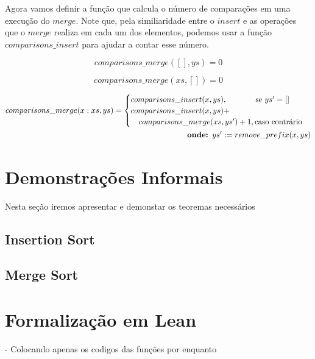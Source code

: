 \documentclass[12pt, oneside, a4paper,english,brazil]{abntex2}
\begin{document}
\qquad Agora vamos definir a fun\c{c}\~ao que calcula o n\'umero de compara\c{c}\~oes em uma execu\c{c}\~ao
do $merge$. Note que, pela similiaridade entre
o $insert$ e as opera\c{c}\~oes que o $merge$ realiza em cada um dos elementos,
podemos usar a fun\c{c}\~ao $comparisons\_insert$ para ajudar a contar esse n\'umero.

\begin{equation}
  comparisons\_merge([], ys) = 0
\end{equation}

\begin{equation}
  comparisons\_merge(xs, []) = 0
\end{equation}

\begin{equation}
\begin{split}
  comparisons\_merge(x : xs, ys) =
      \begin{cases}
        comparisons\_insert(x, ys), \text{\qquad \quad \,\, se } ys' = [] \\
        comparisons\_insert(x, ys) + \\ \text{\quad} comparisons\_merge(xs, ys') + 1, \text{caso contr\'ario}
      \end{cases} \\
  \text{\qquad\textbf{onde: }} ys' := remove\_prefix(x, ys)
\end{split}
\end{equation}

\chapter{Demonstra\c{c}\~oes Informais}

Nesta se\c{c}\~ao iremos apresentar e demonstar os teoremas necess\'arios


\section{Insertion Sort}
\section{Merge Sort}

\chapter{Formaliza\c{c}\~ao em Lean}
- Colocando apenas os codigos das fun\c{c}\~oes por enquanto

\inputminted{lean}{declarations.lean}
\end{document}
